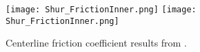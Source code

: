 \documentclass[11pt]{article}
\begin{document}
\begin{figure}[h!]
\centering
\texttt{[image: Shur\_FrictionInner.png]}
\texttt{[image: Shur\_FrictionInner.png]}
\caption{Centerline friction coefficient results from \citet{shur2000}.}
\label{fig:Shur_Results}
\end{figure}





\end{document}

